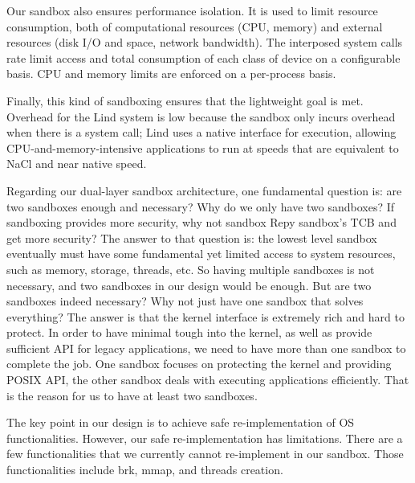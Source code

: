 Our sandbox also ensures performance isolation. It is used to limit resource consumption, 
both of computational resources (CPU, memory) and external resources (disk I/O and space, 
network bandwidth). The interposed system calls rate limit access and total consumption of 
each class of device on a configurable basis. CPU and memory limits are enforced on 
a per-process basis. 

Finally, this kind of sandboxing ensures that the lightweight goal is met. Overhead for the Lind system 
is low because the sandbox only incurs overhead when there is a system call; Lind uses a native interface 
for execution, allowing CPU-and-memory-intensive applications to run at speeds that are equivalent 
to NaCl and near native speed. 

Regarding our dual-layer sandbox architecture, one fundamental question is: are two sandboxes 
enough and necessary? Why do we only have two sandboxes? If sandboxing provides more security, 
why not sandbox Repy sandbox's TCB and get more security? The answer to that question is: 
the lowest level sandbox eventually must have some fundamental yet limited access to system resources, 
such as memory, storage, threads, etc. So having multiple sandboxes is not necessary, and two sandboxes in 
our design would be enough. But are two sandboxes indeed necessary? Why not just have one sandbox 
that solves everything? The answer is that the kernel interface is extremely rich and hard to protect. 
In order to have minimal tough into the kernel, as well as provide sufficient API for legacy applications, 
we need to have more than one sandbox to complete the job. One sandbox focuses on protecting 
the kernel and providing POSIX API, the other sandbox deals with executing applications efficiently. 
That is the reason for us to have at least two sandboxes.  

The key point in our design is to achieve safe re-implementation of OS functionalities. 
However, our safe re-implementation has limitations. There are a few functionalities that 
we currently cannot re-implement in our sandbox. Those functionalities include brk, mmap, and threads creation.